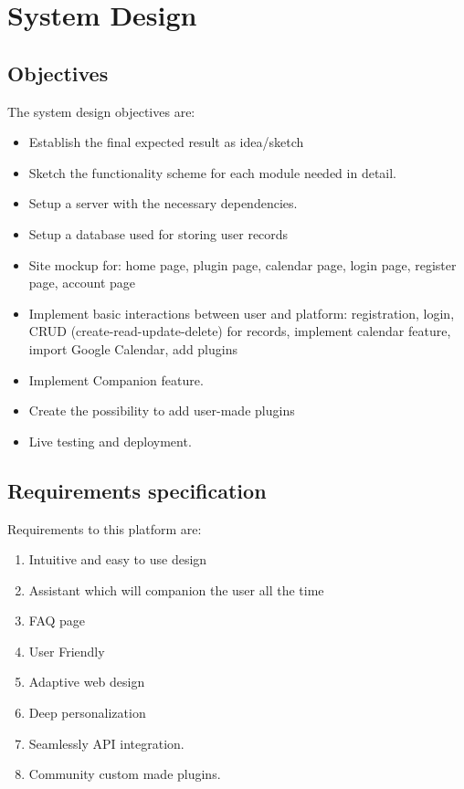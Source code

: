 \section{System Design}
\graphicspath{ {./images/} }

\subsection{Objectives}
\par The system design objectives are:
\begin{itemize}
	\item Establish the final expected result as idea/sketch 
	\item Sketch the functionality scheme for each module needed in detail.
	\item Setup a server with the necessary dependencies.
	\item Setup a database used for storing user records
	\item Site mockup for: home page, plugin page, calendar page, login page, register page, account page
	\item Implement basic interactions between user and platform: registration, login, CRUD (create-read-update-delete) for records, implement calendar feature, import Google Calendar, add plugins
	\item Implement Companion feature.
	\item Create the possibility to add user-made plugins 
	\item Live testing and deployment.
	
\end{itemize}


\subsection{Requirements specification}
\par Requirements to this platform are:  
\begin{enumerate}
	\item Intuitive and easy to use design  
	
	\item Assistant which will companion the user all the time  
	
	\item FAQ page  
	
	\item User Friendly 
	
	\item Adaptive web design 
	
	\item Deep personalization 
	
	\item Seamlessly API integration. 
	
	\item Community custom made plugins. 
\end{enumerate}



